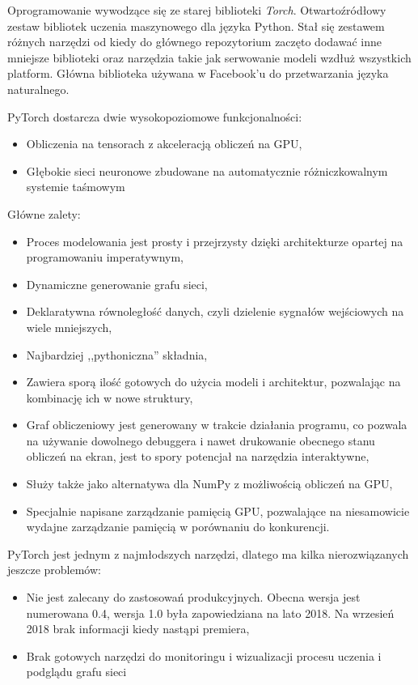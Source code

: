 \documentclass[12pt,a4paper,twoside,titlepage,openright]{book}
\begin{document}
Oprogramowanie wywodzące się ze starej biblioteki \textit{Torch}. Otwartoźródłowy zestaw bibliotek uczenia maszynowego dla języka Python. Stał się zestawem różnych narzędzi od kiedy do głównego repozytorium zaczęto dodawać inne mniejsze biblioteki oraz narzędzia takie jak serwowanie modeli wzdłuż wszystkich platform. Główna biblioteka używana w Facebook'u do przetwarzania języka naturalnego. 

PyTorch dostarcza dwie wysokopoziomowe funkcjonalności:
\begin{itemize}
\item Obliczenia na tensorach z akceleracją obliczeń na GPU,
\item Głębokie sieci neuronowe zbudowane na automatycznie różniczkowalnym systemie taśmowym
\end{itemize}

Główne zalety:
\begin{itemize}
\item Proces modelowania jest prosty i przejrzysty dzięki architekturze opartej na programowaniu imperatywnym,
\item Dynamiczne generowanie grafu sieci,
\item Deklaratywna równoległość danych, czyli dzielenie sygnałów wejściowych na wiele mniejszych,
\item Najbardziej ,,pythoniczna'' składnia,
\item Zawiera sporą ilość gotowych do użycia modeli i architektur, pozwalając na kombinację ich w nowe struktury,
\item Graf obliczeniowy jest generowany w trakcie działania programu, co pozwala na używanie dowolnego debuggera i nawet drukowanie obecnego stanu obliczeń na ekran, jest to spory potencjał na narzędzia interaktywne,
\item Służy także jako alternatywa dla NumPy z możliwością obliczeń na GPU,
\item Specjalnie napisane zarządzanie pamięcią GPU, pozwalające na niesamowicie wydajne zarządzanie pamięcią w porównaniu do konkurencji.
\end{itemize}

PyTorch jest jednym z najmłodszych narzędzi, dlatego ma kilka nierozwiązanych jeszcze problemów:
\begin{itemize}
\item Nie jest zalecany do zastosowań produkcyjnych. Obecna wersja jest numerowana 0.4, wersja 1.0 była zapowiedziana na lato 2018. Na wrzesień 2018 brak informacji kiedy nastąpi premiera,
\item Brak gotowych narzędzi do monitoringu i wizualizacji procesu uczenia i podglądu grafu sieci
\end{itemize}\cite{book:2226069}
\end{document}
